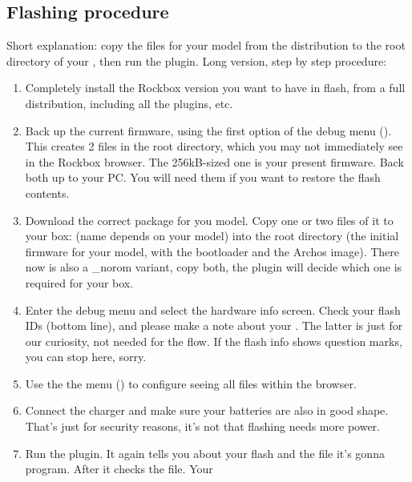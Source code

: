 \subsection{Flashing procedure}
Short explanation: copy the  files for your model from the
distribution to the root directory of your \dap, then run the 
 plugin.
Long version, step by step procedure:
\begin{enumerate}
\item Completely install the Rockbox version you want to have in flash, from a 
  full  distribution, including all the plugins, etc.
\item Back up the current firmware, using the first option of the debug menu 
  ().
  This creates 2 files in the root directory, which you may not immediately see 
  in the Rockbox browser. The 256kB-sized  one is your present firmware. Back  both up to your PC. You will need them if 
  you want to restore the flash contents.
\item Download the correct package for you model. Copy one or two files of it to 
  your box:  (name depends on your model) into the root 
  directory (the initial firmware for your model, with the bootloader and the 
  Archos image). There now is also a \_norom variant, copy both, the plugin will 
  decide which one is required for your box.
\item Enter the debug menu and select the hardware info screen. Check your flash 
  IDs (bottom line), and please make a note about your . The latter is just for our 
  curiosity, not needed for the flow. If the flash info shows question  marks, 
  you can stop here, sorry.
\item Use the the menu () to 
  configure seeing all files within the browser.
\item Connect the charger and make sure your batteries are also in good shape. 
  That's just for security reasons, it's not that flashing needs more power.
\item Run the  plugin. It again tells you about your 
  flash and the file it's gonna program. After  it checks the file. Your 

\end{enumerate}
